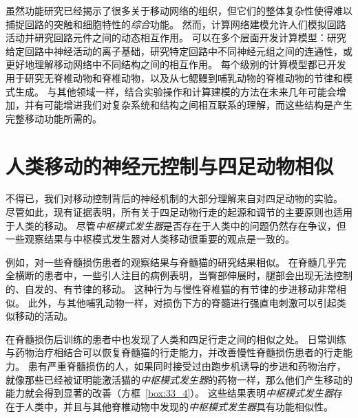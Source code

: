 虽然功能研究已经揭示了很多关于移动网络的组织，但它们的整体复杂性使得难以捕捉回路的突触和细胞特性的\textit{综合}功能。
然而，计算网络建模允许人们模拟回路活动并研究回路元件之间的动态相互作用。
可以在多个层面开发计算模型：研究给定回路中神经活动的离子基础，研究特定回路中不同神经元组之间的连通性，或更好地理解移动网络中不同结构之间的相互作用。
每个级别的计算模型都已开发用于研究无脊椎动物和脊椎动物，以及从七鳃鳗到哺乳动物的脊椎动物的节律和模式生成。
与其他领域一样，结合实验操作和计算建模的方法在未来几年可能会增加，并有可能增进我们对复杂系统和结构之间相互联系的理解，而这些结构是产生完整移动功能所需的。


\section{人类移动的神经元控制与四足动物相似}

不得已，我们对移动控制背后的神经机制的大部分理解来自对四足动物的实验。
尽管如此，现有证据表明，所有关于四足动物行走的起源和调节的主要原则也适用于人类的移动。
尽管\textit{中枢模式发生器}是否存在于人类中的问题仍然存在争议，但一些观察结果与中枢模式发生器对人类移动很重要的观点是一致的。


例如，对一些脊髓损伤患者的观察结果与脊髓猫的研究结果相似。
在脊髓几乎完全横断的患者中，一些引人注目的病例表明，当臀部伸展时，腿部会出现无法控制的、自发的、有节律的移动。
这种行为与慢性脊椎猫的有节律的步进移动非常相似。
此外，与其他哺乳动物一样，对损伤下方的脊髓进行强直电刺激可以引起类似移动的活动。


在脊髓损伤后训练的患者中也发现了人类和四足行走之间的相似之处。
日常训练与药物治疗相结合可以恢复脊髓猫的行走能力，并改善慢性脊髓损伤患者的行走能力。
患有严重脊髓损伤的人，如果同时接受过由跑步机诱导的步进和药物治疗，就像那些已经被证明能激活猫的\textit{中枢模式发生器}的药物一样，那么他们产生移动的能力就会得到显著的改善（方框~\ref{box:33_4}）。
这些结果表明\textit{中枢模式发生器}存在于人类中，并且与其他脊椎动物中发现的\textit{中枢模式发生器}具有功能相似性。



